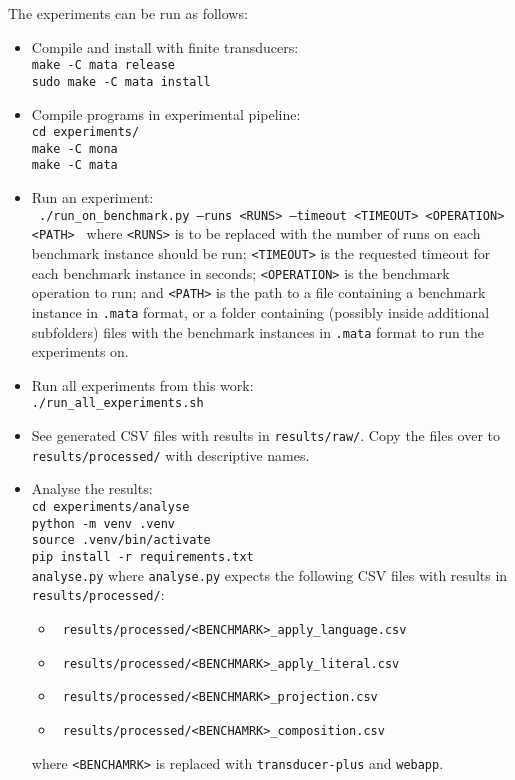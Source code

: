 The experiments can be run as follows:
\begin{itemize}
  \item Compile and install \mata with finite transducers:
  \\
  \texttt{make -C mata release}
  \\
  \texttt{sudo make -C mata install}

  \item Compile programs in experimental pipeline:
  \\
  \texttt{cd experiments/}
  \\
  \texttt{make -C mona}
  \\
  \texttt{make -C mata}

  \item Run an experiment:
  \\
  \texttt{
    ./run\_on\_benchmark.py --runs <RUNS> --timeout <TIMEOUT> <OPERATION> <PATH>
  }
  where \texttt{<RUNS>} is to be replaced with the number of runs on each benchmark instance should be run; \texttt{<TIMEOUT>} is the requested timeout for each benchmark instance in seconds; \texttt{<OPERATION>} is the benchmark operation to run; and \texttt{<PATH>} is the path to a file containing a benchmark instance in \texttt{.mata} format, or a folder containing (possibly inside additional subfolders) files with the benchmark instances in \texttt{.mata} format to run the experiments on.

  \item Run all experiments from this work:
  \\
  \texttt{./run\_all\_experiments.sh}

  \item See generated CSV files with results in \texttt{results/raw/}. Copy the files over to \texttt{results/processed/} with descriptive names.

  \item Analyse the results:
  \\
  \texttt{cd experiments/analyse}
  \\
  \texttt{python -m venv .venv}
  \\
  \texttt{source .venv/bin/activate}
  \\
  \texttt{pip install -r requirements.txt}
  \\
  \texttt{analyse.py}
  where \texttt{analyse.py} expects the following CSV files with results in \texttt{results/processed/}:
  \begin{itemize}
    \item \texttt{
    results/processed/<BENCHMARK>\_apply\_language.csv
    }
    \item \texttt{
      results/processed/<BENCHMARK>\_apply\_literal.csv
    }

    \item \texttt{
results/processed/<BENCHMARK>\_projection.csv
    }

    \item \texttt{
results/processed/<BENCHAMRK>\_composition.csv
    }
  \end{itemize}
  where \texttt{<BENCHAMRK>} is replaced with \texttt{transducer-plus} and \texttt{webapp}.

\end{itemize}


